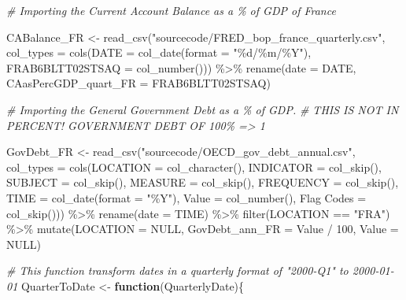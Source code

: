\documentclass[
]{article}
\newenvironment{Shaded}{\begin{snugshade}}{\end{snugshade}}
\newcommand{\AttributeTok}[1]{\textcolor[rgb]{0.77,0.63,0.00}{#1}}
\newcommand{\CommentTok}[1]{\textcolor[rgb]{0.56,0.35,0.01}{\textit{#1}}}
\newcommand{\ConstantTok}[1]{\textcolor[rgb]{0.00,0.00,0.00}{#1}}
\newcommand{\ControlFlowTok}[1]{\textcolor[rgb]{0.13,0.29,0.53}{\textbf{#1}}}
\newcommand{\DecValTok}[1]{\textcolor[rgb]{0.00,0.00,0.81}{#1}}
\newcommand{\FunctionTok}[1]{\textcolor[rgb]{0.00,0.00,0.00}{#1}}
\newcommand{\NormalTok}[1]{#1}
\newcommand{\OtherTok}[1]{\textcolor[rgb]{0.56,0.35,0.01}{#1}}
\newcommand{\SpecialCharTok}[1]{\textcolor[rgb]{0.00,0.00,0.00}{#1}}
\newcommand{\StringTok}[1]{\textcolor[rgb]{0.31,0.60,0.02}{#1}}
\begin{document}
\begin{Shaded}
\begin{Highlighting}[]
\CommentTok{\# Importing the Current Account Balance as a \% of GDP of France}

\NormalTok{CABalance\_FR }\OtherTok{\textless{}{-}} \FunctionTok{read\_csv}\NormalTok{(}\StringTok{"sourcecode/FRED\_bop\_france\_quarterly.csv"}\NormalTok{, }
    \AttributeTok{col\_types =} \FunctionTok{cols}\NormalTok{(}\AttributeTok{DATE =} \FunctionTok{col\_date}\NormalTok{(}\AttributeTok{format =} \StringTok{"\%d/\%m/\%Y"}\NormalTok{), }
        \AttributeTok{FRAB6BLTT02STSAQ =} \FunctionTok{col\_number}\NormalTok{())) }\SpecialCharTok{\%\textgreater{}\%}
  \FunctionTok{rename}\NormalTok{(}\AttributeTok{date =}\NormalTok{ DATE, }\AttributeTok{CAasPercGDP\_quart\_FR =}\NormalTok{ FRAB6BLTT02STSAQ)}


\CommentTok{\# Importing the General Government Debt as a \% of GDP. }
\CommentTok{\# THIS IS NOT IN PERCENT! GOVERNMENT DEBT OF 100\%  =\textgreater{} 1}

\NormalTok{GovDebt\_FR }\OtherTok{\textless{}{-}} \FunctionTok{read\_csv}\NormalTok{(}\StringTok{"sourcecode/OECD\_gov\_debt\_annual.csv"}\NormalTok{, }
    \AttributeTok{col\_types =} \FunctionTok{cols}\NormalTok{(}\AttributeTok{LOCATION =} \FunctionTok{col\_character}\NormalTok{(), }
        \AttributeTok{INDICATOR =} \FunctionTok{col\_skip}\NormalTok{(), }\AttributeTok{SUBJECT =} \FunctionTok{col\_skip}\NormalTok{(), }
        \AttributeTok{MEASURE =} \FunctionTok{col\_skip}\NormalTok{(), }\AttributeTok{FREQUENCY =} \FunctionTok{col\_skip}\NormalTok{(), }
        \AttributeTok{TIME =} \FunctionTok{col\_date}\NormalTok{(}\AttributeTok{format =} \StringTok{"\%Y"}\NormalTok{), }\AttributeTok{Value =} \FunctionTok{col\_number}\NormalTok{(), }
        \StringTok{\textasciigrave{}}\AttributeTok{Flag Codes}\StringTok{\textasciigrave{}} \OtherTok{=} \FunctionTok{col\_skip}\NormalTok{())) }\SpecialCharTok{\%\textgreater{}\%}
  \FunctionTok{rename}\NormalTok{(}\AttributeTok{date =}\NormalTok{ TIME) }\SpecialCharTok{\%\textgreater{}\%}
  \FunctionTok{filter}\NormalTok{(LOCATION }\SpecialCharTok{==} \StringTok{"FRA"}\NormalTok{) }\SpecialCharTok{\%\textgreater{}\%}
  \FunctionTok{mutate}\NormalTok{(}\AttributeTok{LOCATION =} \ConstantTok{NULL}\NormalTok{, }\AttributeTok{GovDebt\_ann\_FR =}\NormalTok{ Value }\SpecialCharTok{/} \DecValTok{100}\NormalTok{, }\AttributeTok{Value =} \ConstantTok{NULL}\NormalTok{)}


\CommentTok{\# This function transform dates in a quarterly format of "2000{-}Q1" to 2000{-}01{-}01}
\NormalTok{QuarterToDate }\OtherTok{\textless{}{-}} \ControlFlowTok{function}\NormalTok{(QuarterlyDate)\{}
  

\end{Highlighting}
\end{Shaded}
\end{document}
